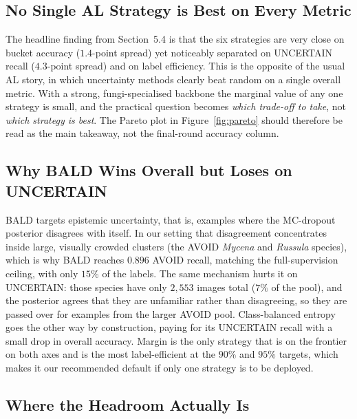 \documentclass[11pt]{article}
\begin{document}
\subsection{No Single AL Strategy is Best on Every Metric}

The headline finding from Section~5.4 is that the six strategies are very
close on bucket accuracy ($1.4$-point spread) yet noticeably separated on
UNCERTAIN recall ($4.3$-point spread) and on label efficiency. This is the
opposite of the usual AL story, in which uncertainty methods clearly beat
random on a single overall metric. With a strong, fungi-specialised
backbone the marginal value of any one strategy is small, and the
practical question becomes \emph{which trade-off to take}, not \emph{which
strategy is best}. The Pareto plot in Figure~\ref{fig:pareto} should
therefore be read as the main takeaway, not the final-round accuracy
column.

\subsection{Why BALD Wins Overall but Loses on UNCERTAIN}

BALD targets epistemic uncertainty, that is, examples where the MC-dropout
posterior disagrees with itself. In our setting that disagreement
concentrates inside large, visually crowded clusters (the AVOID
\emph{Mycena} and \emph{Russula} species), which is why BALD reaches
$0.896$ AVOID recall, matching the full-supervision ceiling, with only
$15\%$ of the labels. The same mechanism hurts it on UNCERTAIN: those
species have only $2{,}553$ images total ($7\%$ of the pool), and the
posterior agrees that they are unfamiliar rather than disagreeing, so they
are passed over for examples from the larger AVOID pool. Class-balanced
entropy goes the other way by construction, paying for its UNCERTAIN
recall with a small drop in overall accuracy. Margin is the only strategy
that is on the frontier on both axes and is the most label-efficient at
the $90\%$ and $95\%$ targets, which makes it our recommended default if
only one strategy is to be deployed.

\subsection{Where the Headroom Actually Is}
\end{document}
